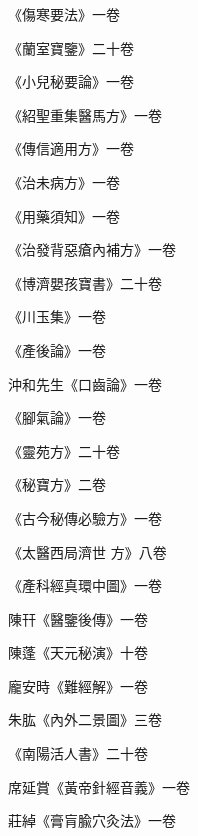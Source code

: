 \begin{pinyinscope}
 《傷寒要法》一卷



 《蘭室寶鑒》二十卷



 《小兒秘要論》一卷



 《紹聖重集醫馬方》一卷



 《傳信適用方》一卷



 《治未病方》一卷



 《用藥須知》一卷



 《治發背惡瘡內補方》一卷



 《博濟嬰孩寶書》二十卷



 《川玉集》一卷



 《產後論》一卷



 沖和先生《口齒論》一卷



 《腳氣論》一卷



 《靈苑方》二十卷



 《秘寶方》二卷



 《古今秘傳必驗方》一卷



 《太醫西局濟世
 方》八卷



 《產科經真環中圖》一卷



 陳幵《醫鑒後傳》一卷



 陳蓬《天元秘演》十卷



 龐安時《難經解》一卷



 朱肱《內外二景圖》三卷



 《南陽活人書》二十卷



 席延賞《黃帝針經音義》一卷



 莊綽《膏肓腧穴灸法》一卷




\end{pinyinscope}
